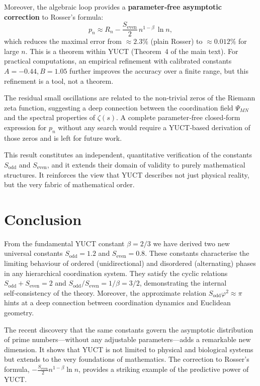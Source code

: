 \documentclass[12pt,a4paper]{article}
\begin{document}
	Moreover, the algebraic loop provides a \textbf{parameter‑free asymptotic correction} to Rosser’s formula:
	\[
	p_n \approx R_n - \frac{S_{\mathrm{even}}}{2}\, n^{1-\beta}\,\ln n,
	\]
	which reduces the maximal error from \(\approx 2.3\%\) (plain Rosser) to \(\approx 0.012\%\) for large \(n\).  This is a theorem within YUCT (Theorem~4 of the main text).  For practical computations, an empirical refinement with calibrated constants \(A=-0.44, B=1.05\) further improves the accuracy over a finite range, but this refinement is a tool, not a theorem.
	
	The residual small oscillations are related to the non‑trivial zeros of the Riemann zeta function, suggesting a deep connection between the coordination field \(\Psi_{MN}\) and the spectral properties of \(\zeta(s)\).  A complete parameter‑free closed‑form expression for \(p_n\) without any search would require a YUCT‑based derivation of those zeros and is left for future work.
	
	This result constitutes an independent, quantitative verification of the constants \(S_{\mathrm{odd}}\) and \(S_{\mathrm{even}}\), and it extends their domain of validity to purely mathematical structures.  It reinforces the view that YUCT describes not just physical reality, but the very fabric of mathematical order.
	
	\section{Conclusion}
	From the fundamental YUCT constant \(\beta = 2/3\) we have derived two new universal constants \(S_{\text{odd}} = 1.2\) and \(S_{\text{even}} = 0.8\). These constants characterise the limiting behaviour of ordered (unidirectional) and disordered (alternating) phases in any hierarchical coordination system. They satisfy the cyclic relations \(S_{\text{odd}}+S_{\text{even}}=2\) and \(S_{\text{odd}}/S_{\text{even}} = 1/\beta = 3/2\), demonstrating the internal self‑consistency of the theory. Moreover, the approximate relation \(S_{\text{odd}}\varphi^2 \approx \pi\) hints at a deep connection between coordination dynamics and Euclidean geometry.
	
	The recent discovery that the same constants govern the asymptotic distribution of prime numbers—without any adjustable parameters—adds a remarkable new dimension. It shows that YUCT is not limited to physical and biological systems but extends to the very foundations of mathematics. The correction to Rosser's formula, \(-\frac{S_{\text{even}}}{2}n^{1-\beta}\ln n\), provides a striking example of the predictive power of YUCT.
	
\end{document}
